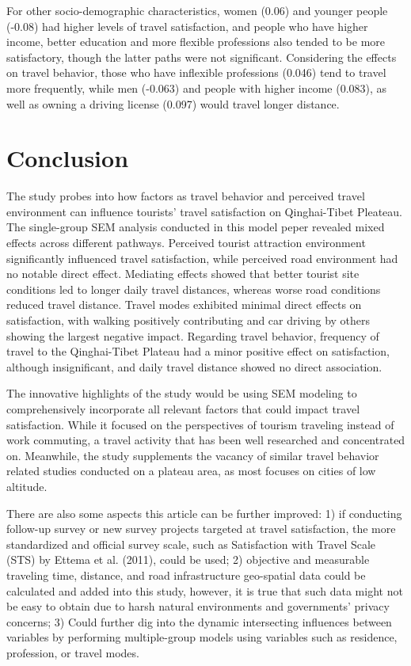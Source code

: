 \documentclass[
11pt, %
oneside, %
english, %
singlespacing, %
]{macthesis} %
\begin{document}
For other socio-demographic characteristics, women (0.06) and younger people (-0.08) had higher levels of travel satisfaction, and people who have higher income, better education and more flexible professions also tended to be more satisfactory, though the latter paths were not significant. Considering the effects on travel behavior, those who have inflexible professions (0.046) tend to travel more frequently, while men (-0.063) and people with higher income (0.083), as well as owning a driving license (0.097) would travel longer distance.

\chapter*{Conclusion}\label{conclusion}

The study probes into how factors as travel behavior and perceived travel environment can influence tourists' travel satisfaction on Qinghai-Tibet Pleateau. The single-group SEM analysis conducted in this model peper revealed mixed effects across different pathways. Perceived tourist attraction environment significantly influenced travel satisfaction, while perceived road environment had no notable direct effect. Mediating effects showed that better tourist site conditions led to longer daily travel distances, whereas worse road conditions reduced travel distance. Travel modes exhibited minimal direct effects on satisfaction, with walking positively contributing and car driving by others showing the largest negative impact. Regarding travel behavior, frequency of travel to the Qinghai-Tibet Plateau had a minor positive effect on satisfaction, although insignificant, and daily travel distance showed no direct association.

The innovative highlights of the study would be using SEM modeling to comprehensively incorporate all relevant factors that could impact travel satisfaction. While it focused on the perspectives of tourism traveling instead of work commuting, a travel activity that has been well researched and concentrated on. Meanwhile, the study supplements the vacancy of similar travel behavior related studies conducted on a plateau area, as most focuses on cities of low altitude.

There are also some aspects this article can be further improved: 1) if conducting follow-up survey or new survey projects targeted at travel satisfaction, the more standardized and official survey scale, such as Satisfaction with Travel Scale (STS) by Ettema et al. (2011), could be used; 2) objective and measurable traveling time, distance, and road infrastructure geo-spatial data could be calculated and added into this study, however, it is true that such data might not be easy to obtain due to harsh natural environments and governments' privacy concerns; 3) Could further dig into the dynamic intersecting influences between variables by performing multiple-group models using variables such as residence, profession, or travel modes.
\end{document}
